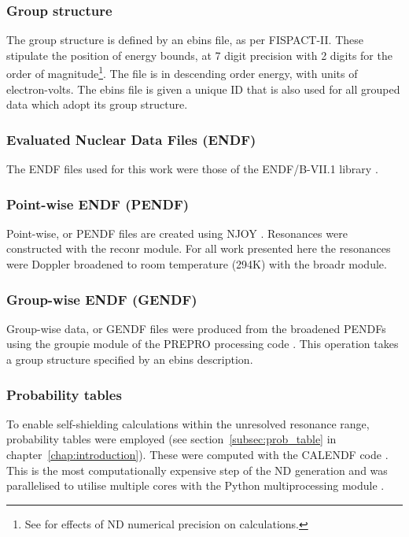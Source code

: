 \subsubsection{Group structure}
The group structure is defined by an ebins file, as per FISPACT-II. These stipulate the position of energy bounds, at 7 digit precision with 2 digits for the order of magnitude\footnote{See \cite{Cullen1988} for effects of ND numerical precision on calculations.}. The file is in descending order energy, with units of electron-volts. The ebins file is given a unique ID that is also used for all grouped data which adopt its group structure.

\subsubsection{Evaluated Nuclear Data Files (ENDF)}
The ENDF files used for this work were those of the ENDF/B-VII.1 library \cite{Chadwick2011}.

\subsubsection{Point-wise ENDF (PENDF)}
Point-wise, or PENDF files are created using NJOY \cite{MacFarlane2016}. Resonances were constructed with the reconr module. For all work presented here the resonances were Doppler broadened to room temperature (294K) with the broadr module. 

\subsubsection{Group-wise ENDF (GENDF)}
Group-wise data, or GENDF files were produced from the broadened PENDFs using the groupie module of the PREPRO processing code \cite{cullen2017}. This operation takes a group structure specified by an ebins description.

\subsubsection{Probability tables}
To enable self-shielding calculations within the unresolved resonance range, probability tables were employed (see section~\ref{subsec:prob_table} in chapter~\ref{chap:introduction}). These were computed with the CALENDF code \cite{sublet2011}. This is the most computationally expensive step of the ND generation and was parallelised to utilise multiple cores with the Python multiprocessing module \cite{multiprocessing2018}.

